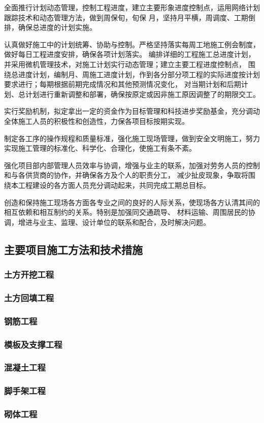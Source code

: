  全面推行计划动态管理，控制工程进度，建立主要形象进度控制点，运用网络计划跟踪技术和动态管理方法，做到周保旬，旬保
月，坚持月平横，周调度、工期倒排，确保总进度的计划实施。

 认真做好施工中的计划统筹、协助与控制。严格坚持落实每周工地施工例会制度，做好每日工程进度安排，确保各项计划落实。
编排详细的工程施工总进度计划，并采用微机管理技术，对施工计划实行动态管理；建立主要工程进度控制点，
围绕总进度计划，编制月、周施工进度计划，作到各分部分项工程的实际进度按计划要求进行；每期根据前期完成情况和其他预测情况变化，
对当期计划和后期计划、总计划进行重新调整和部署，确保按原定或因非施工原因调整了的期限交工。

 实行奖励机制，拟定拿出一定的资金作为目标管理和科技进步奖励基金，充分调动全体施工人员的积极性和创造性，力保各项目标按期实现。

 制定各工序的操作规程和质量标准，强化施工现场管理，做到安全文明施工，努力实现施工管理的标准化、科学化、合理化，使施工有条不紊。

 强化项目部内部管理人员效率与协调，增强与业主的联系，加强对劳务人员的控制和与各供货商的协作，并确保各方及个人的职责分工，
减少扯皮现象，争取将围绕本工程建设的各方面人员充分调动起来，共同完成工期总目标。

 创造和保持施工现场各方面各专业之间的良好的人际关系，使现场各方认清其间的相互依赖和相互制约的关系。特别是加强同交通疏导、
材料运输、周围居民的协调，增进与业主、监理、设计单位的联系和配合，及时解决问题。\\

\subsection{主要项目施工方法和技术措施}
\subsubsection{土方开挖工程}
\subsubsection{土方回填工程}
\subsubsection{钢筋工程}
\subsubsection{模板及支撑工程}
\subsubsection{混凝土工程}
\subsubsection{脚手架工程}
\subsubsection{砌体工程}
